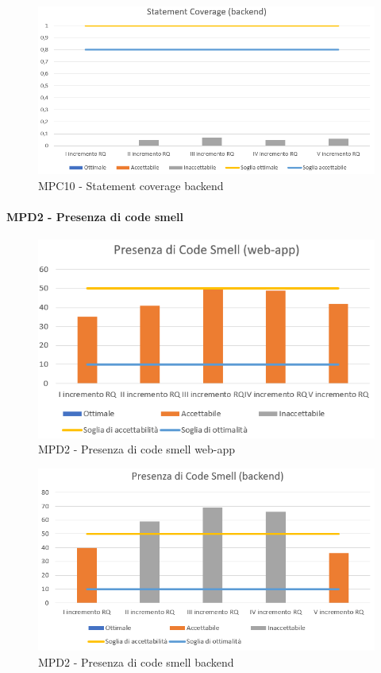   \begin{figure}[h!]
    \centering
      \includegraphics[scale=1]{Immagini/StatCov BE.PNG}
    \caption{MPC10 - Statement coverage backend}
  \end{figure}



  \newpage
  \paragraph{MPD2 - Presenza di code smell}
  \begin{figure}[h!]
    \centering
      \includegraphics[scale=1]{Immagini/CodeSmell WA.PNG}
    \caption{MPD2 - Presenza di code smell web-app}
  \end{figure}

  \begin{figure}[h!]
    \centering
      \includegraphics[scale=1]{Immagini/CodeSmell BE.PNG}
    \caption{MPD2 - Presenza di code smell backend}
  \end{figure}

